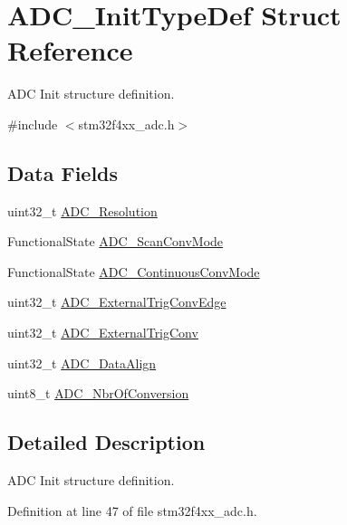\hypertarget{struct_a_d_c___init_type_def}{\section{A\-D\-C\-\_\-\-Init\-Type\-Def Struct Reference}
\label{struct_a_d_c___init_type_def}
}


A\-D\-C Init structure definition.  




{\ttfamily \#include $<$stm32f4xx\-\_\-adc.\-h$>$}

\subsection*{Data Fields}
\begin{DoxyCompactItemize}
\item 
uint32\-\_\-t \hyperlink{struct_a_d_c___init_type_def_ae6309271617f7a67c7428d2b6c4c63b0}{A\-D\-C\-\_\-\-Resolution}
\item 
Functional\-State \hyperlink{struct_a_d_c___init_type_def_aa48a8ce21112f7262d5447bfe568e4b3}{A\-D\-C\-\_\-\-Scan\-Conv\-Mode}
\item 
Functional\-State \hyperlink{struct_a_d_c___init_type_def_a3f6e0c1cc2d0e7134c1d24e3ca373074}{A\-D\-C\-\_\-\-Continuous\-Conv\-Mode}
\item 
uint32\-\_\-t \hyperlink{struct_a_d_c___init_type_def_a4243ef59cd2e57d4ea4ed8e0d7451ea0}{A\-D\-C\-\_\-\-External\-Trig\-Conv\-Edge}
\item 
uint32\-\_\-t \hyperlink{struct_a_d_c___init_type_def_a2a0142b756e9b3e30f858f4666f12c36}{A\-D\-C\-\_\-\-External\-Trig\-Conv}
\item 
uint32\-\_\-t \hyperlink{struct_a_d_c___init_type_def_a360ec5c7f6e5e1de535ec50dfc2c7e9b}{A\-D\-C\-\_\-\-Data\-Align}
\item 
uint8\-\_\-t \hyperlink{struct_a_d_c___init_type_def_a2b480f62e18149cf047c1028cf5a4d5c}{A\-D\-C\-\_\-\-Nbr\-Of\-Conversion}
\end{DoxyCompactItemize}


\subsection{Detailed Description}
A\-D\-C Init structure definition. 

Definition at line 47 of file stm32f4xx\-\_\-adc.\-h.



